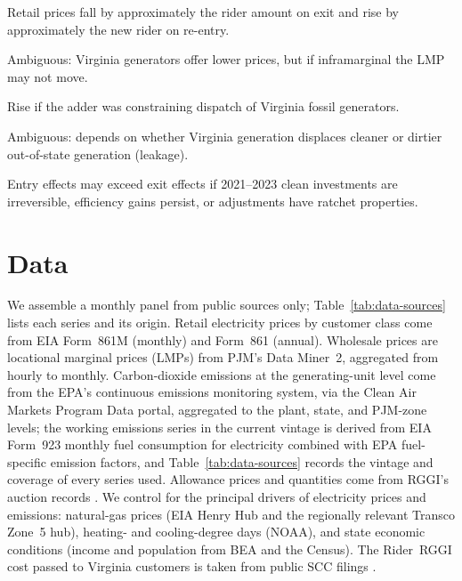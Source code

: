 \documentclass[12pt]{article}
\begin{document}
\begin{prediction}\label{pr:retail}
Retail prices fall by approximately the rider amount on exit and rise by approximately the
new rider on re-entry.
\end{prediction}
\begin{prediction}\label{pr:wholesale}
Ambiguous: Virginia generators offer lower prices, but if inframarginal the LMP may not move.
\end{prediction}
\begin{prediction}\label{pr:va-emissions}
Rise if the adder was constraining dispatch of Virginia fossil generators.
\end{prediction}
\begin{prediction}\label{pr:system-emissions}
Ambiguous: depends on whether Virginia generation displaces cleaner or dirtier out-of-state generation (leakage).
\end{prediction}
\begin{prediction}\label{pr:asymmetry}
Entry effects may exceed exit effects if 2021--2023 clean investments are irreversible,
efficiency gains persist, or adjustments have ratchet properties.
\end{prediction}

\section{Data}\label{sec:data}
We assemble a monthly panel from public sources only; Table~\ref{tab:data-sources} lists each
series and its origin. Retail electricity prices by customer class come from EIA Form~861M
(monthly) and Form~861 (annual). Wholesale prices are locational marginal prices (LMPs) from
PJM's Data Miner~2, aggregated from hourly to monthly. Carbon-dioxide emissions at the
generating-unit level come from the EPA's continuous emissions monitoring system, via the
Clean Air Markets Program Data portal, aggregated to the plant, state, and PJM-zone levels;
the working emissions series in the current vintage is derived from EIA Form~923 monthly
fuel consumption for electricity combined with EPA fuel-specific \co{} emission factors,
and Table~\ref{tab:data-sources} records the vintage and coverage of every series used.
Allowance prices and quantities come from RGGI's auction records \citep{RGGI_auctions}. We
control for the principal drivers of electricity prices and emissions: natural-gas prices
(EIA Henry Hub and the regionally relevant Transco Zone~5 hub), heating- and cooling-degree
days (NOAA), and state economic conditions (income and population from BEA and the Census).
The Rider~RGGI cost passed to Virginia customers is taken from public SCC filings
\citep{DominionSCC_rider}.
\end{document}
